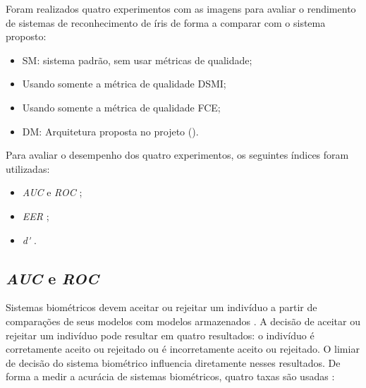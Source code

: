 

\par Foram realizados quatro experimentos com as imagens para avaliar o rendimento de sistemas de reconhecimento de íris de forma a comparar com o sistema proposto:

\begin{itemize}
    \item \acrfull{SM}: sistema padrão, sem usar métricas de qualidade;
    \item Usando somente a métrica de qualidade DSMI;
    \item Usando somente a métrica de qualidade FCE;
    \item \acrfull{DM}: Arquitetura proposta no projeto ().
\end{itemize}

\par Para avaliar o desempenho dos quatro experimentos, os seguintes índices foram utilizadas:

\begin{itemize}
    \item \textit{\acrfull{AUC}} e \textit{\acrfull{ROC}} \cite{d33BEAT, aucROC, daugman2000};
    \item \textit{\acrfull{EER}} \cite{eer,d33BEAT};
    \item \textit{\acrfull{d'}} \cite{daugman2000}.
\end{itemize}

\subsection{\textit{\acrfull{AUC}} e \textit{\acrfull{ROC}}}\label{sec:experimentos:auc}

\par Sistemas biométricos devem aceitar ou rejeitar um indivíduo a partir de comparações de seus modelos com modelos armazenados \cite{wayman2005biometric}. A decisão de aceitar ou rejeitar um indivíduo pode resultar em quatro resultados: o indivíduo é corretamente aceito ou rejeitado ou é incorretamente aceito ou rejeitado. O limiar de decisão do sistema biométrico influencia diretamente nesses resultados. De forma a medir a acurácia de sistemas biométricos, quatro taxas são usadas \cite{daugman2000}:

